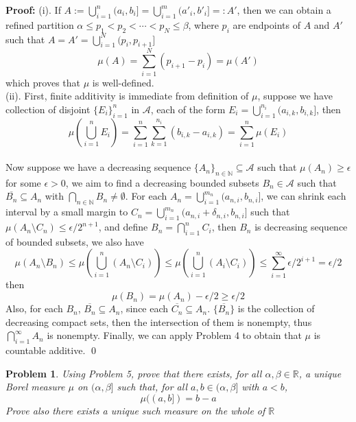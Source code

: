 \documentclass[12pt]{article}
\newtheorem{problem}{Problem}
\begin{document}
\textbf{Proof:} (i). If $A:=\bigcup\limits_{i=1}^n(a_i, b_i]=\bigcup_{i=1}^m(a'_i, b'_i]=: A'$, then we can obtain a refined partition $\alpha\leq p_1<p_2<\cdots<p_N\leq \beta$, where $p_i$ are endpoints of $A$ and $A'$ such that $A=A'=\bigcup\limits_{i=1}^N(p_i,p_{i+1}]$
$$
    \mu(A)=\sum\limits_{i=1}^N(p_{i+1}-p_{i})=\mu(A')
$$
which proves that $\mu$ is well-defined. \\
\indent (ii). First, finite additivity is immediate from definition of $\mu$, suppose we have collection of disjoint $\{E_i\}_{i=1}^n$ in $\mathcal{A}$, each of the form $E_i=\bigcup\limits_{i=1}^{n_i}(a_{i, k}, b_{i, k}]$, then 
$$
    \mu\left(\bigcup_{i=1}^n E_i\right)=\sum\limits_{i=1}^n\sum\limits_{k=1}^{n_i}(b_{i,k}-a_{i,k})=\sum\limits_{i=1}^n\mu(E_i)
$$
\\
\indent Now suppose we have a decreasing sequence $\{A_n\}_{n\in\mathbb{N}}\subseteq\mathcal{A}$ such that $\mu(A_n)\geq\epsilon$ for some $\epsilon>0$, we aim to find a decreasing bounded subsets $B_n\in\mathcal{A}$ such that $\overline{B_n}\subseteq A_n$ with $\bigcap_{n\in\mathbb{N}}B_n\neq\emptyset$. For each $A_n=\bigcup\limits_{i=1}^{m_n}(a_{n,i}, b_{n, i}]$, we can shrink each interval by a small margin to $C_n=\bigcup\limits_{i=1}^{m_n}(a_{n,i}+\delta_{n,i},b_{n,i}]$ such that $\mu(A_n\setminus C_n)\leq \epsilon/2^{n+1}$, and define $B_n=\bigcap\limits_{i=1}^n C_i$, then $B_n$ is decreasing sequence of bounded subsets, we also have 
$$
    \mu(A_n\setminus B_n)\leq \mu\left(\bigcup_{i=1}^n(A_n\setminus C_i)\right)\leq \mu\left(\bigcup_{i=1}^n(A_i\setminus C_i)\right)\leq \sum\limits_{i=1}^\infty \epsilon/2^{i+1}=\epsilon/2
$$
then 
$$
    \mu(B_n)=\mu(A_n)-\epsilon/2\geq \epsilon/2
$$
Also, for each $B_n$, $\overline{B_n}\subseteq A_n$, since each $\overline{C_n}\subseteq A_n$. $\{\overline{B_n}\}$ is the collection of decreasing compact sets, then the intersection of them is nonempty, thus $\bigcap\limits_{i=1}^\infty A_n$ is nonempty. Finally, we can apply Problem 4 to obtain that $\mu$ is countable additive. \qed  
\\
\begin{problem}
    Using Problem 5, prove that there exists, for all $\alpha, \beta\in\mathbb{R}$, a unique Borel measure $\mu$ on $(\alpha,\beta]$ such that, for all $a,b\in (\alpha, \beta]$ with $a<b$, 
    $$
        \mu((a,b])=b-a
    $$
    Prove also there exists a unique such measure on the whole of $\mathbb{R}$
\end{problem}
\end{document}
